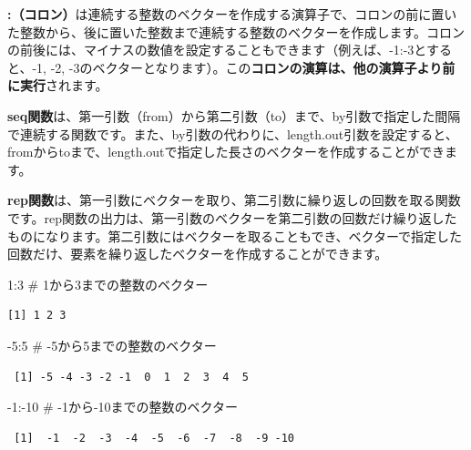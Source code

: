 \documentclass[
  letterpaper,
  DIV=11,
  numbers=noendperiod]{scrreprt}
\newenvironment{Shaded}{\begin{snugshade}}{\end{snugshade}}
\newcommand{\CommentTok}[1]{\textcolor[rgb]{0.37,0.37,0.37}{#1}}
\newcommand{\DecValTok}[1]{\textcolor[rgb]{0.68,0.00,0.00}{#1}}
\newcommand{\SpecialCharTok}[1]{\textcolor[rgb]{0.37,0.37,0.37}{#1}}
\begin{document}
\textbf{:（コロン）}は連続する整数のベクターを作成する演算子で、コロンの前に置いた整数から、後に置いた整数まで連続する整数のベクターを作成します。コロンの前後には、マイナスの数値を設定することもできます（例えば、-1:-3とすると、-1,
-2,
-3のベクターとなります）。この\textbf{コロンの演算は、他の演算子より前に実行}されます。

\textbf{seq関数}は、第一引数（from）から第二引数（to）まで、by引数で指定した間隔で連続する関数です。また、by引数の代わりに、length.out引数を設定すると、fromからtoまで、length.outで指定した長さのベクターを作成することができます。

\textbf{rep関数}は、第一引数にベクターを取り、第二引数に繰り返しの回数を取る関数です。rep関数の出力は、第一引数のベクターを第二引数の回数だけ繰り返したものになります。第二引数にはベクターを取ることもでき、ベクターで指定した回数だけ、要素を繰り返したベクターを作成することができます。

\begin{Shaded}
\begin{Highlighting}[]
\DecValTok{1}\SpecialCharTok{:}\DecValTok{3} \CommentTok{\# 1から3までの整数のベクター}
\end{Highlighting}
\end{Shaded}

\begin{verbatim}
[1] 1 2 3
\end{verbatim}

\begin{Shaded}
\begin{Highlighting}[]
\SpecialCharTok{{-}}\DecValTok{5}\SpecialCharTok{:}\DecValTok{5} \CommentTok{\# {-}5から5までの整数のベクター}
\end{Highlighting}
\end{Shaded}

\begin{verbatim}
 [1] -5 -4 -3 -2 -1  0  1  2  3  4  5
\end{verbatim}

\begin{Shaded}
\begin{Highlighting}[]
\SpecialCharTok{{-}}\DecValTok{1}\SpecialCharTok{:{-}}\DecValTok{10} \CommentTok{\# {-}1から{-}10までの整数のベクター}
\end{Highlighting}
\end{Shaded}

\begin{verbatim}
 [1]  -1  -2  -3  -4  -5  -6  -7  -8  -9 -10
\end{verbatim}
\end{document}

